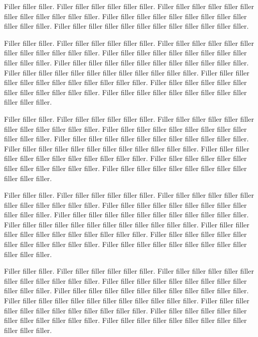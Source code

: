 \documentclass[landscape,twocolumn,letterpaper]{article}
\begin{document}
Filler filler filler.
Filler filler filler filler filler filler.
Filler filler filler filler filler filler filler filler filler filler filler filler.
Filler filler filler filler filler filler filler filler filler filler filler filler.
Filler filler filler filler filler filler filler filler filler filler filler filler.

Filler filler filler.
Filler filler filler filler filler filler.
Filler filler filler filler filler filler filler filler filler filler filler filler.
Filler filler filler filler filler filler filler filler filler filler filler filler.
Filler filler filler filler filler filler filler filler filler filler filler filler.
Filler filler filler filler filler filler filler filler filler filler filler filler.
Filler filler filler filler filler filler filler filler filler filler filler filler.
Filler filler filler filler filler filler filler filler filler filler filler filler.
Filler filler filler filler filler filler filler filler filler filler filler filler.

Filler filler filler.
Filler filler filler filler filler filler.
Filler filler filler filler filler filler filler filler filler filler filler filler.
Filler filler filler filler filler filler filler filler filler filler filler filler.
Filler filler filler filler filler filler filler filler filler filler filler filler.
Filler filler filler filler filler filler filler filler filler filler filler filler.
Filler filler filler filler filler filler filler filler filler filler filler filler.
Filler filler filler filler filler filler filler filler filler filler filler filler.
Filler filler filler filler filler filler filler filler filler filler filler filler.

Filler filler filler.
Filler filler filler filler filler filler.
Filler filler filler filler filler filler filler filler filler filler filler filler.
Filler filler filler filler filler filler filler filler filler filler filler filler.
Filler filler filler filler filler filler filler filler filler filler filler filler.
Filler filler filler filler filler filler filler filler filler filler filler filler.
Filler filler filler filler filler filler filler filler filler filler filler filler.
Filler filler filler filler filler filler filler filler filler filler filler filler.
Filler filler filler filler filler filler filler filler filler filler filler filler.


Filler filler filler.
Filler filler filler filler filler filler.
Filler filler filler filler filler filler filler filler filler filler filler filler.
Filler filler filler filler filler filler filler filler filler filler filler filler.
Filler filler filler filler filler filler filler filler filler filler filler filler.
Filler filler filler filler filler filler filler filler filler filler filler filler.
Filler filler filler filler filler filler filler filler filler filler filler filler.
Filler filler filler filler filler filler filler filler filler filler filler filler.
Filler filler filler filler filler filler filler filler filler filler filler filler.
\end{document}
